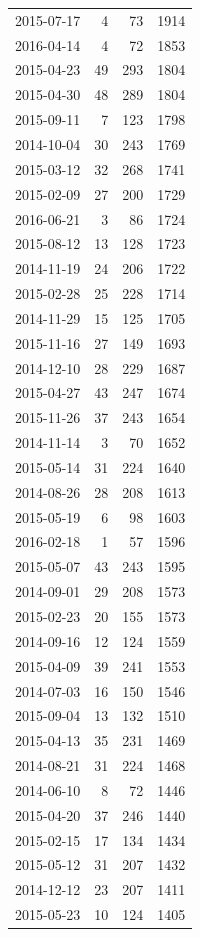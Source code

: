 \begin{tabular}{lrrr}
2015-07-17 & 4 & 73 & 1914 \\
2016-04-14 & 4 & 72 & 1853 \\
2015-04-23 & 49 & 293 & 1804 \\
2015-04-30 & 48 & 289 & 1804 \\
2015-09-11 & 7 & 123 & 1798 \\
2014-10-04 & 30 & 243 & 1769 \\
2015-03-12 & 32 & 268 & 1741 \\
2015-02-09 & 27 & 200 & 1729 \\
2016-06-21 & 3 & 86 & 1724 \\
2015-08-12 & 13 & 128 & 1723 \\
2014-11-19 & 24 & 206 & 1722 \\
2015-02-28 & 25 & 228 & 1714 \\
2014-11-29 & 15 & 125 & 1705 \\
2015-11-16 & 27 & 149 & 1693 \\
2014-12-10 & 28 & 229 & 1687 \\
2015-04-27 & 43 & 247 & 1674 \\
2015-11-26 & 37 & 243 & 1654 \\
2014-11-14 & 3 & 70 & 1652 \\
2015-05-14 & 31 & 224 & 1640 \\
2014-08-26 & 28 & 208 & 1613 \\
2015-05-19 & 6 & 98 & 1603 \\
2016-02-18 & 1 & 57 & 1596 \\
2015-05-07 & 43 & 243 & 1595 \\
2014-09-01 & 29 & 208 & 1573 \\
2015-02-23 & 20 & 155 & 1573 \\
2014-09-16 & 12 & 124 & 1559 \\
2015-04-09 & 39 & 241 & 1553 \\
2014-07-03 & 16 & 150 & 1546 \\
2015-09-04 & 13 & 132 & 1510 \\
2015-04-13 & 35 & 231 & 1469 \\
2014-08-21 & 31 & 224 & 1468 \\
2014-06-10 & 8 & 72 & 1446 \\
2015-04-20 & 37 & 246 & 1440 \\
2015-02-15 & 17 & 134 & 1434 \\
2015-05-12 & 31 & 207 & 1432 \\
2014-12-12 & 23 & 207 & 1411 \\
2015-05-23 & 10 & 124 & 1405 \\

\end{tabular}
